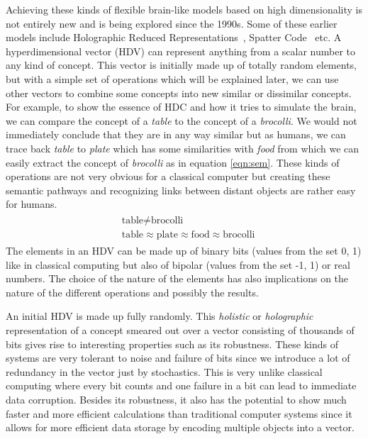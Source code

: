 Achieving these kinds of flexible brain-like models based on high dimensionality is not entirely new and is being explored since the 1990s. Some of these earlier models include Holographic Reduced Representations~\cite{HRR}, Spatter Code~\cite{spatter} etc. A hyperdimensional vector (HDV) can represent anything from a scalar number to any kind of concept. This vector is initially made up of totally random elements, but with a simple set of operations which will be explained later, we can use other vectors to combine some concepts into new similar or dissimilar concepts. For example, to show the essence of HDC and how it tries to simulate the brain, we can compare the concept of a \textit{table} to the concept of a \textit{brocolli}. We would not immediately conclude that they are in any way similar but as humans, we can trace back \textit{table} to \textit{plate} which has some similarities with \textit{food} from which we can easily extract the concept of \textit{brocolli} as in equation \ref{eqn:sem}. These kinds of operations are not very obvious for a classical computer but creating these semantic pathways and recognizing links between distant objects are rather easy for humans.
\begin{align}\label{eqn:sem}
    \begin{split}
    &\textrm{table} \neq \textrm{brocolli} \\        
    &\textrm{table} \approx \textrm{plate} \approx \textrm{food} \approx \textrm{brocolli}
    \end{split}
\end{align}
The elements in an HDV can be made up of binary bits (values from the set {0, 1}) like in classical computing but also of bipolar (values from the set {-1, 1}) or real numbers. The choice of the nature of the elements has also implications on the nature of the different operations and possibly the results.

An initial HDV is made up fully randomly. This \textit{holistic} or \textit{holographic} representation of a concept smeared out over a vector consisting of thousands of bits gives rise to interesting properties such as its robustness. These kinds of systems are very tolerant to noise and failure of bits since we introduce a lot of redundancy in the vector just by stochastics. This is very unlike classical computing where every bit counts and one failure in a bit can lead to immediate data corruption. Besides its robustness, it also has the potential to show much faster and more efficient calculations than traditional computer systems since it allows for more efficient data storage by encoding multiple objects into a vector.
